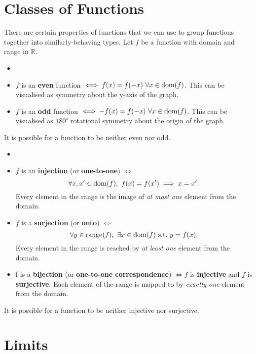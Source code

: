 \documentclass[../real_analysis.tex]{subfiles}
\begin{document}
    \section{Classes of Functions}
        There are certain properties of functions that we can use to group functions together into similarly-behaving types. Let $f$ be a function with domain and range in $\mathbb{R}$.
        \begin{definition}
            \begin{itemize} \item[]
                \item $f$ is an \textbf{even} function $\iff f(x) = f(-x)\ \forall x \in \operatorname{dom}(f)$. This can be visualised as symmetry about the y-axis of the graph.
                \item $f$ is an \textbf{odd} function $\iff -f(x) = f(-x)\ \forall x \in \operatorname{dom}(f)$. This can be visualised as $180^\circ$ rotational symmetry about the origin of the graph.
            \end{itemize}
            It is possible for a function to be neither even nor odd.
        \end{definition}
        \begin{definition}
            \begin{itemize} \item[]
                \item $f$ is an \textbf{injection} (or \textbf{one-to-one}) $\iff$
                \[\forall x, x^\prime \in \operatorname{dom}(f),\ {f(x) = f(x^\prime) \implies x = x^\prime}.\] Every element in the range is the image of \textit{at most one} element from the domain.
                \item $f$ is a \textbf{surjection} (or \textbf{onto}) $\iff$
                \[\forall y \in \operatorname{range}(f),\ \exists x \in \operatorname{dom}(f)\  \text{s.t.}\ y = f(x).\]
                Every element in the range is reached by \textit{at least one} element from the domain.
                \item f is a \textbf{bijection} (or \textbf{one-to-one correspondence}) $\iff f$ is \textbf{injective} and $f$ is \textbf{surjective}. Each element of the range is mapped to by \textit{exactly one} element from the domain.
            \end{itemize}
            It is possible for a function to be neither  injective nor surjective.
        \end{definition}

    \section{Limits}
\end{document}
